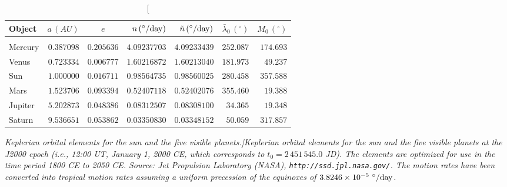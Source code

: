\clearpage
\begin{table}\centering
\begin{tabular}{l|rcrrrr}
Object &  $a\,(AU)$ & $e$ & $n\,(^\circ/{\rm day})$ & $\tilde{n}\,(^\circ/{\rm day})$ & $\bar{\lambda}_0\,(^\circ)$ & $M_0\,(^\circ)$\\\hline
&&&&&&\\[-2.2ex]
Mercury & $0.387098$  & $0.205636$ & $4.09237703$     & $4.09233439$    & $252.087$ & $174.693$  \\
Venus     & $0.723334$  & $0.006777$  & $1.60216872$    & $1.60213040$  & $181.973$ & $49.237$ \\
Sun       & $1.000000$  & $0.016711$  & $0.98564735$      & $0.98560025$  & $280.458$ & $357.588$   \\
Mars      & $1.523706$  & $0.093394$  & $0.52407118$     & $0.52402076$  & $355.460$ & $19.388$ \\ 
Jupiter   & $5.202873$  & $0.048386$  & $0.08312507$     & $0.08308100$    & $34.365$ & $19.348$\\
Saturn   & $9.536651$  & $0.053862$    & $0.03350830$     & $0.03348152$   & $50.059$ & $317.857$ \\
\end{tabular}
\caption[\em  Keplerian orbital elements for the sun and the five visible planets.]{\em Keplerian orbital elements for the sun and the five visible planets at the J2000 epoch ({\em i.e.}, 12:00 UT, January 1, 2000 CE,
which corresponds to $t_0 = 2\,451\,545.0$ JD). The elements are optimized for use in the
time period 1800 CE to 2050 CE. Source: Jet Propulsion Laboratory (NASA), {\tt http://ssd.jpl.nasa.gov/}.  The motion rates have been converted into tropical motion rates assuming a uniform precession of the equinoxes
 of $3.8246\times 10^{-5}\,\,^\circ/{\rm day}$.}\label{lt4}
\end{table}

